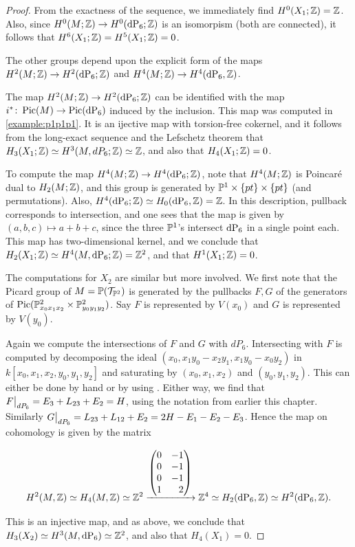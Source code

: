 \begin{proof}
From the exactness of the sequence, we immediately find $H^0(X_1;\Z)=\Z$. Also, since $H^0(M;\Z) \to H^0(\dP6;\Z)$ is an isomorpism (both are connected), it follows that $H^6(X_1;\Z)=H^5(X_1;\Z)=0$.

The other groups depend upon the explicit form of the maps $H^2(M;\Z) \to H^2(\dP6;\Z)$ and $H^4(M;\Z) \to H^4(\dP6,\Z)$.

The map $H^2(M;\Z) \to H^2(\dP6;\Z)$ can be identified with the map $i^\ast \colon \Pic(M) \to \Pic(\dP6)$ induced by the inclusion. This map was computed in \cref{example:p1p1p1}. It is an ijective map with torsion-free cokernel, and it follows from the long-exact sequence and the Lefschetz theorem that $H_3(X_1;\Z) \simeq H^3(M,dP_6; \Z) \simeq \Z$, and also that $H_4(X_1;\Z)=0$.

To compute the map $H^4(M;\Z) \to H^4(\dP6;\Z)$, note that $H^4(M;\Z)$ is Poincaré dual to $H_ 2(M;\Z)$, and this group is generated by $\P^1 \times \{pt\} \times \{ pt\}$ (and permutations). Also, $H^4(\dP6;\Z) \simeq H_0(\dP6,\Z)=\Z$. In this description, pullback corresponds to intersection, and one sees that the map is given by $(a,b,c) \mapsto a+b+c$, since the three $\P^1$'s intersect $\dP6$ in a single point each. This map has two-dimensional kernel, and we conclude that $H_2(X_1;\Z) \simeq H^4(M,\dP6;\Z) = \Z^2$, and that $H^1(X_1;\Z)=0$.

The computations for $X_2$ are similar but more involved. We first note that the Picard group of $M=\P(\mathcal T_{\P^2})$ is generated by the pullbacks $F,G$ of the generators of $\Pic(\P^2_{x_0x_1x_2} \times \P^2_{y_0y_1y_2})$. Say $F$ is represented by $V(x_0)$ and $G$ is represented by $V(y_0)$.

Again we compute the intersections of $F$ and $G$ with $dP_6$. Intersecting with $F$ is computed by decomposing the ideal $(x_0,x_1y_0-x_2y_1,x_1y_0-x_0y_2)$ in $k[x_0,x_1,x_2,y_0,y_1,y_2]$ and saturating by $(x_0,x_1,x_2)$ and $(y_0,y_1,y_2)$. This can either be done by hand or by using \MM. Either way, we find that $\restr{F}{dP_6} = E_3+L_{23} + E_2=H$, using the notation from earlier this chapter. Similarly $\restr{G}{dP_6}=L_{23}+L_{12}+E_2=2H-E_1-E_2-E_3$. Hence the map on cohomology is given by the matrix

\[
H^2(M,\Z) \simeq H_4(M,\Z) \simeq \Z^2 \xrightarrow{
	\begin{pmatrix*}[r]
	0 & -1 \\
	0 & -1 \\
	0 & -1  \\
	1 & 2 
	\end{pmatrix*}
} \Z^4 \simeq H_2(\dP6,\Z) \simeq H^2(\dP6,\Z).
\]

This is an injective map, and as above, we conclude that $H_3(X_2) \simeq H^3(M,\dP6) \simeq \Z^2$, and also that $H_4(X_1)=0$.
\end{proof}

